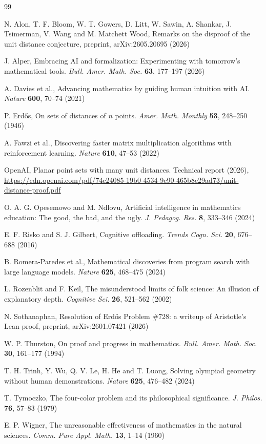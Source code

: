\documentclass[12pt]{article}
\begin{document}
\begin{thebibliography}{99}

N. Alon, T. F. Bloom, W. T. Gowers, D. Litt, W. Sawin, A. Shankar, J. Tsimerman, V. Wang and M. Matchett Wood, Remarks on the disproof of the unit distance conjecture, preprint, arXiv:2605.20695 (2026)

J. Alper, Embracing AI and formalization: Experimenting with tomorrow's mathematical tools. \textit{Bull. Amer. Math. Soc.} \textbf{63}, 177--197 (2026)

A. Davies et al., Advancing mathematics by guiding human intuition with AI. \textit{Nature} \textbf{600}, 70--74 (2021)

P. Erdős, On sets of distances of $n$ points. \textit{Amer. Math. Monthly} \textbf{53}, 248--250 (1946)

A. Fawzi et al., Discovering faster matrix multiplication algorithms with reinforcement learning. \textit{Nature} \textbf{610}, 47--53 (2022)

OpenAI, Planar point sets with many unit distances. Technical report (2026), \url{https://cdn.openai.com/pdf/74c24085-19b0-4534-9c90-465b8e29ad73/unit-distance-proof.pdf}

O. A. G. Opesemowo and M. Ndlovu, Artificial intelligence in mathematics education: The good, the bad, and the ugly. \textit{J. Pedagog. Res.} \textbf{8}, 333--346 (2024)

E. F. Risko and S. J. Gilbert, Cognitive offloading. \textit{Trends Cogn. Sci.} \textbf{20}, 676--688 (2016)

B. Romera-Paredes et al., Mathematical discoveries from program search with large language models. \textit{Nature} \textbf{625}, 468--475 (2024)

L. Rozenblit and F. Keil, The misunderstood limits of folk science: An illusion of explanatory depth. \textit{Cognitive Sci.} \textbf{26}, 521--562 (2002)

N. Sothanaphan, Resolution of Erdős Problem \#728: a writeup of Aristotle's Lean proof, preprint, arXiv:2601.07421 (2026)

W. P. Thurston, On proof and progress in mathematics. \textit{Bull. Amer. Math. Soc.} \textbf{30}, 161--177 (1994)

T. H. Trinh, Y. Wu, Q. V. Le, H. He and T. Luong, Solving olympiad geometry without human demonstrations. \textit{Nature} \textbf{625}, 476--482 (2024)

T. Tymoczko, The four-color problem and its philosophical significance. \textit{J. Philos.} \textbf{76}, 57--83 (1979)

E. P. Wigner, The unreasonable effectiveness of mathematics in the natural sciences. \textit{Comm. Pure Appl. Math.} \textbf{13}, 1--14 (1960)

\end{thebibliography}
\end{document}
